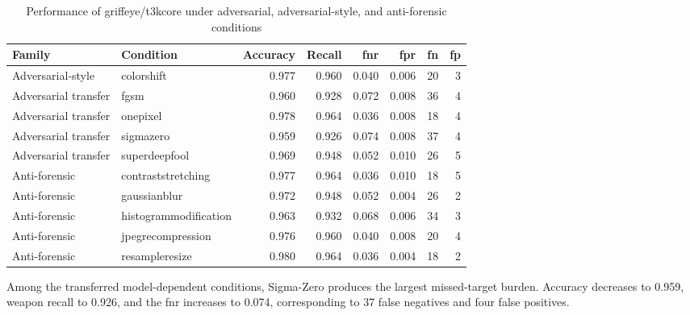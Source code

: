 \begin{table}[H]
\centering
\scriptsize
\renewcommand{\arraystretch}{1.12}
\setlength{\tabcolsep}{4pt}
\caption{Performance of \gls{griffeye}/\gls{t3kcore} under adversarial,
adversarial-style, and anti-forensic conditions}
\label{tab:results-griffeye-attack-metrics}
\begin{tabular}{@{}l l r r r r r r@{}}
\toprule
\textbf{Family} &
\textbf{Condition} &
\textbf{Accuracy} &
\textbf{Recall} &
\textbf{\gls{fnr}} &
\textbf{\gls{fpr}} &
\textbf{\acrshort{fn}} &
\textbf{\acrshort{fp}} \\
\midrule

Adversarial-style
&
\gls{colorshift}
&
0.977
&
0.960
&
0.040
&
0.006
&
20
&
3 \\

Adversarial transfer
&
\gls{fgsm}
&
0.960
&
0.928
&
0.072
&
0.008
&
36
&
4 \\

Adversarial transfer
&
\gls{onepixel}
&
0.978
&
0.964
&
0.036
&
0.008
&
18
&
4 \\

Adversarial transfer
&
\gls{sigmazero}
&
0.959
&
0.926
&
0.074
&
0.008
&
37
&
4 \\

Adversarial transfer
&
\gls{superdeepfool}
&
0.969
&
0.948
&
0.052
&
0.010
&
26
&
5 \\

\midrule

Anti-forensic
&
\gls{contraststretching}
&
0.977
&
0.964
&
0.036
&
0.010
&
18
&
5 \\

Anti-forensic
&
\gls{gaussianblur}
&
0.972
&
0.948
&
0.052
&
0.004
&
26
&
2 \\

Anti-forensic
&
\gls{histogrammodification}
&
0.963
&
0.932
&
0.068
&
0.006
&
34
&
3 \\

Anti-forensic
&
\gls{jpegrecompression}
&
0.976
&
0.960
&
0.040
&
0.008
&
20
&
4 \\

Anti-forensic
&
\gls{resampleresize}
&
0.980
&
0.964
&
0.036
&
0.004
&
18
&
2 \\

\bottomrule
\end{tabular}
\end{table}

Among the transferred model-dependent conditions, Sigma-Zero produces the
largest missed-target burden. Accuracy decreases to 0.959, weapon recall to
0.926, and the \gls{fnr} increases to 0.074, corresponding to 37 false
negatives and four false positives.

